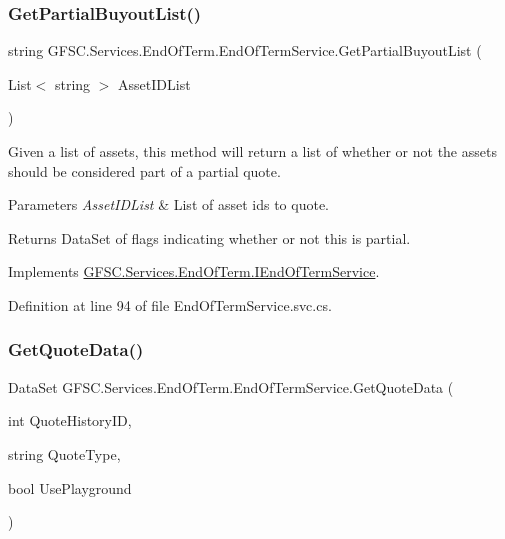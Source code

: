 \subsubsection{\texorpdfstring{Get\+Partial\+Buyout\+List()}{GetPartialBuyoutList()}}
{\footnotesize\ttfamily string G\+F\+S\+C.\+Services.\+End\+Of\+Term.\+End\+Of\+Term\+Service.\+Get\+Partial\+Buyout\+List (\begin{DoxyParamCaption}\item[{List$<$ string $>$}]{Asset\+I\+D\+List }\end{DoxyParamCaption})}



Given a list of assets, this method will return a list of whether or not the assets should be considered part of a partial quote. 


\begin{DoxyParams}{Parameters}
{\em Asset\+I\+D\+List} & List of asset ids to quote.\\
\hline
\end{DoxyParams}
\begin{DoxyReturn}{Returns}
Data\+Set of flags indicating whether or not this is partial.
\end{DoxyReturn}


Implements \mbox{\hyperlink{interface_g_f_s_c_1_1_services_1_1_end_of_term_1_1_i_end_of_term_service_a4523038156d371d4cc3868b19e4e069d}{G\+F\+S\+C.\+Services.\+End\+Of\+Term.\+I\+End\+Of\+Term\+Service}}.



Definition at line 94 of file End\+Of\+Term\+Service.\+svc.\+cs.

\mbox{\label{class_g_f_s_c_1_1_services_1_1_end_of_term_1_1_end_of_term_service_a1585a6265f11c071d2fed688d061d309}} 
\subsubsection{\texorpdfstring{Get\+Quote\+Data()}{GetQuoteData()}}
{\footnotesize\ttfamily Data\+Set G\+F\+S\+C.\+Services.\+End\+Of\+Term.\+End\+Of\+Term\+Service.\+Get\+Quote\+Data (\begin{DoxyParamCaption}\item[{int}]{Quote\+History\+ID,  }\item[{string}]{Quote\+Type,  }\item[{bool}]{Use\+Playground }\end{DoxyParamCaption})}



